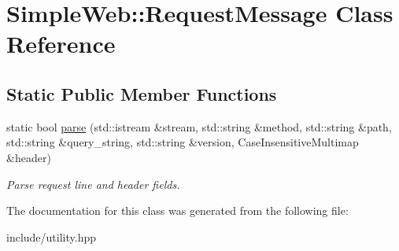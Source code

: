 \hypertarget{classSimpleWeb_1_1RequestMessage}{}\section{Simple\+Web\+:\+:Request\+Message Class Reference}
\label{classSimpleWeb_1_1RequestMessage}
\subsection*{Static Public Member Functions}
\begin{DoxyCompactItemize}
\item 
static bool \hyperlink{classSimpleWeb_1_1RequestMessage_af9314f62c7bdc470398d1b96c180791c}{parse} (std\+::istream \&stream, std\+::string \&method, std\+::string \&path, std\+::string \&query\+\_\+string, std\+::string \&version, Case\+Insensitive\+Multimap \&header)\hypertarget{classSimpleWeb_1_1RequestMessage_af9314f62c7bdc470398d1b96c180791c}{}\label{classSimpleWeb_1_1RequestMessage_af9314f62c7bdc470398d1b96c180791c}

\begin{DoxyCompactList}\small\item\em Parse request line and header fields. \end{DoxyCompactList}\end{DoxyCompactItemize}


The documentation for this class was generated from the following file\+:\begin{DoxyCompactItemize}
\item 
include/utility.\+hpp\end{DoxyCompactItemize}
